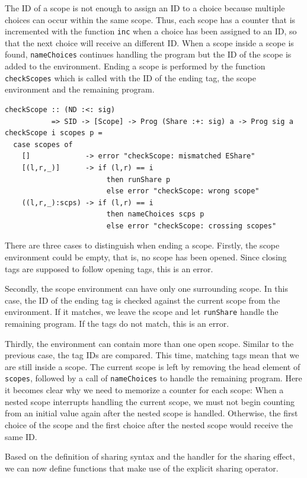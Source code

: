 \documentclass[a4paper, 11pt, fleqn, twoside, abstract=on]{scrreprt}
\newcommand{\hinl}[1]{\texttt{#1}}
\begin{document}
The ID of a scope is not enough to assign an ID to a choice because multiple choices can occur within the same scope.
Thus, each scope has a counter that is incremented with the function \hinl{inc} when a choice has been assigned to an ID, so that the next choice will receive an different ID.
When a scope inside a scope is found, \hinl{nameChoices} continues handling the program but the ID of the scope is added to the environment.
Ending a scope is performed by the function \hinl{checkScopes} which is called with the ID of the ending tag, the scope environment and the remaining program.

\begin{verbatim}
checkScope :: (ND :<: sig)
           => SID -> [Scope] -> Prog (Share :+: sig) a -> Prog sig a
checkScope i scopes p =
  case scopes of
    []             -> error "checkScope: mismatched EShare"
    [(l,r,_)]      -> if (l,r) == i
                        then runShare p
                        else error "checkScope: wrong scope"
    ((l,r,_):scps) -> if (l,r) == i
                        then nameChoices scps p
                        else error "checkScope: crossing scopes"
\end{verbatim}

There are three cases to distinguish when ending a scope.
Firstly, the scope environment could be empty, that is, no scope has been opened.
Since closing tags are supposed to follow opening tags, this is an error.

Secondly, the scope environment can have only one surrounding scope.
In this case, the ID of the ending tag is checked against the current scope from the environment.
If it matches, we leave the scope and let \hinl{runShare} handle the remaining program.
If the tags do not match, this is an error.

Thirdly, the environment can contain more than one open scope.
Similar to the previous case, the tag IDs are compared.
This time, matching tags mean that we are still inside a scope.
The current scope is left by removing the head element of \hinl{scopes}, followed by a call of \hinl{nameChoices} to handle the remaining program.
Here it becomes clear why we need to memorize a counter for each scope: When a nested scope interrupts handling the current scope, we must not begin counting from an initial value again after the nested scope is handled.
Otherwise, the first choice of the scope and the first choice after the nested scope would receive the same ID.

Based on the definition of sharing syntax and the handler for the sharing effect, we can now define functions that make use of the explicit sharing operator.
\pagebreak
\end{document}
